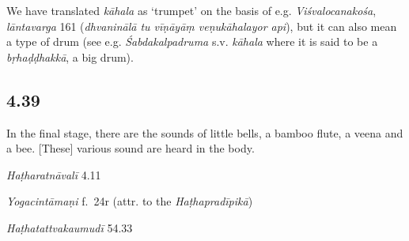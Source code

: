 \begin{ekdosis}
\begin{philcomm}[hp04_038]
We have translated \emph{kāhala} as `trumpet' on the basis of e.g. \emph{Viśvalocanakośa}, \emph{lāntavarga} 161 (\emph{dhvaninālā tu vīṇāyāṃ veṇukāhalayor api}), but it can also mean a type of drum (see e.g. \emph{Śabdakalpadruma} s.v. \emph{kāhala} where it is said to be a \emph{bṛhaḍḍhakkā}, a big drum).%
\end{philcomm}

\subsection*{4.39}
\begin{translation}[hp04_039]
In the final stage, there are the sounds of little bells, a bamboo flute, a veena and a bee. [These] various sound are heard in the body.
\end{translation}


\begin{testimonia}[hp04_039]
\emph{Haṭharatnāvalī} 4.11 
\begin{versinnote}
\end{versinnote}

\emph{Yogacintāmaṇi} f.~24r (attr. to the \emph{Haṭhapradīpikā})
\begin{versinnote}
\end{versinnote}

\emph{Haṭhatattvakaumudī} 54.33
\begin{versinnote}
\end{versinnote}
\end{testimonia}


\end{ekdosis}

